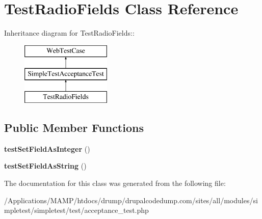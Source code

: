 \hypertarget{class_test_radio_fields}{
\section{TestRadioFields Class Reference}
\label{class_test_radio_fields}
}
Inheritance diagram for TestRadioFields::\begin{figure}[H]
\begin{center}
\leavevmode
\includegraphics[height=3cm]{class_test_radio_fields}
\end{center}
\end{figure}
\subsection*{Public Member Functions}
\begin{DoxyCompactItemize}
\item 
\hypertarget{class_test_radio_fields_ac54cb5d59e7776d3ff25111c41db1968}{
{\bfseries testSetFieldAsInteger} ()}
\label{class_test_radio_fields_ac54cb5d59e7776d3ff25111c41db1968}

\item 
\hypertarget{class_test_radio_fields_a2a46c1f5d867aa4bc23f3e052c02286f}{
{\bfseries testSetFieldAsString} ()}
\label{class_test_radio_fields_a2a46c1f5d867aa4bc23f3e052c02286f}

\end{DoxyCompactItemize}


The documentation for this class was generated from the following file:\begin{DoxyCompactItemize}
\item 
/Applications/MAMP/htdocs/drump/drupalcodedump.com/sites/all/modules/simpletest/simpletest/test/acceptance\_\-test.php\end{DoxyCompactItemize}
